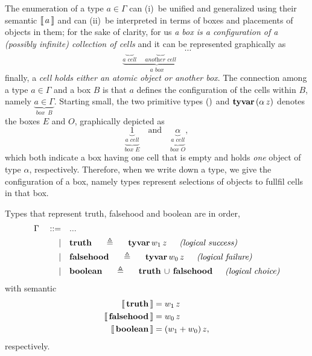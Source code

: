 The enumeration of a type $a\in\Gamma$ can (i)~be unified and generalized using
their semantic $\left\llbracket\,a\,\right\rrbracket$ and can (ii)~be interpreted in terms of boxes and
placements of objects in them; for the sake of clarity, for us \textit{a box is
a configuration of a (possibly infinite) collection of cells} and it can be represented graphically as
\begin{displaymath}
\underbrace{\underbrace{\quad}_{\textit{a cell}}\quad\underbrace{\quad}_{\textit{another cell}}\quad\cdots}_{\textit{a box}}
\end{displaymath}
finally, a \textit{cell holds either an atomic object or another box}. The
connection among a type $a\in\Gamma$ and a box $B$ is that $a$ defines the
configuration of the cells within $B$, namely $\displaystyle
\underbrace{a\in\Gamma}_{\textit{box }\,B}$.  Starting small, the two primitive types
$()$ and $\textbf{tyvar}\,(\alpha\,z)$ denotes the boxes $E$ and $O$, graphically depicted as
\begin{displaymath}
\underbrace{\underbrace{1}_{\textit{a cell}}}_{\textit{box E}}\quad\text{and}\quad
\underbrace{\underbrace{\alpha}_{\textit{a cell}}}_{\textit{box O}},
\end{displaymath} 
which both indicate a box having one cell that is empty and holds \textit{one}
object of type $\alpha$, respectively.  Therefore, when we write down a type,
we give the configuration of a box, namely types represent selections of
objects to fullfil cells in that box.

\begin{definition}[\tytruth, \tyfalsehood, \tyboolean]
Types that represent truth, falsehood and boolean are in order,
\begin{displaymath}
\begin{split}
    \Gamma\quad::=\quad&... \\
           |\quad&\tydef{\tytruth}{\tyvar{w_{1}\,z}}{logical success}\\
           |\quad&\tydef{\tyfalsehood}{\tyvar{w_{0}\,z}}{logical failure}\\
           |\quad&\tydef{\tyboolean}{\tydu{\tytruth}{\tyfalsehood}}{logical choice}\\
\end{split}
\end{displaymath}
with semantic
\begin{displaymath}
\begin{split}
    \left\llbracket\,\textbf{truth}\,\right\rrbracket &= w_{1}\,z\\
    \left\llbracket\,\textbf{falsehood}\,\right\rrbracket &= w_{0}\,z\\
    \left\llbracket\,\textbf{boolean}\,\right\rrbracket &= (w_{1} + w_{0})\,z,
\end{split}
\end{displaymath}
respectively.
\end{definition}

